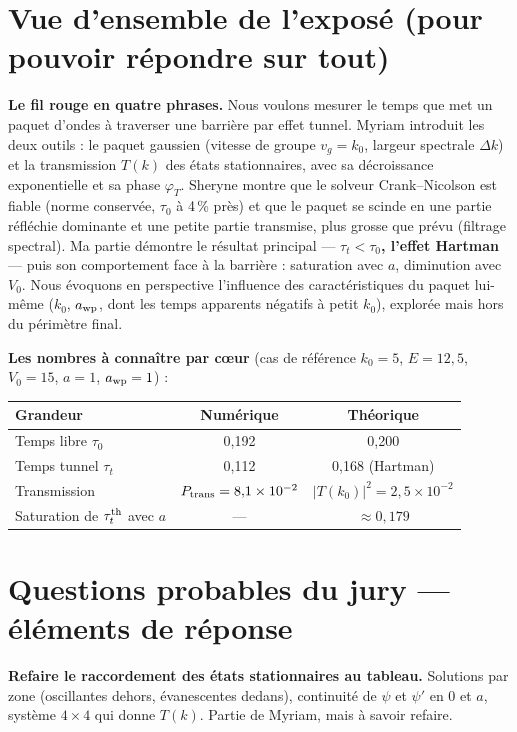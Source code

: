 \documentclass[11pt,a4paper]{article}
\begin{document}
\section*{Vue d'ensemble de l'exposé (pour pouvoir répondre sur tout)}

\textbf{Le fil rouge en quatre phrases.} Nous voulons mesurer le temps que met un
paquet d'ondes à traverser une barrière par effet tunnel. Myriam introduit les
deux outils : le paquet gaussien (vitesse de groupe $v_g = k_0$, largeur
spectrale $\Delta k$) et la transmission $T(k)$ des états stationnaires, avec sa
décroissance exponentielle et sa phase $\varphi_T$. Sheryne montre que le solveur
Crank--Nicolson est fiable (norme conservée, $\tau_0$ à 4\,\% près) et que le
paquet se scinde en une partie réfléchie dominante et une petite partie
transmise, plus grosse que prévu (filtrage spectral). Ma partie démontre le
résultat principal --- \textbf{$\tau_t < \tau_0$, l'effet Hartman} --- puis son
comportement face à la barrière : saturation avec $a$, diminution avec $V_0$.
Nous évoquons en perspective l'influence des caractéristiques du paquet
lui-même ($k_0$, $a_{\rm wp}$, dont les temps apparents négatifs à petit
$k_0$), explorée mais hors du périmètre final.

\textbf{Les nombres à connaître par c\oe ur} (cas de référence $k_0 = 5$,
$E = 12{,}5$, $V_0 = 15$, $a = 1$, $a_{\rm wp} = 1$) :

\begin{center}
\begin{tabular}{lcc}
\toprule
Grandeur & Numérique & Théorique \\
\midrule
Temps libre $\tau_0$ & 0{,}192 & 0{,}200 \\
Temps tunnel $\tau_t$ & 0{,}112 & 0{,}168 (Hartman) \\
Transmission & $P_{\rm trans} = 8{,}1\times10^{-2}$ & $|T(k_0)|^2 = 2{,}5\times10^{-2}$ \\
Saturation de $\tau_t^{\rm th}$ avec $a$ & --- & $\approx 0{,}179$ \\
\bottomrule
\end{tabular}
\end{center}

\section*{Questions probables du jury --- éléments de réponse}

\textbf{Refaire le raccordement des états stationnaires au tableau.}
Solutions par zone (oscillantes dehors, évanescentes dedans), continuité de
$\psi$ et $\psi'$ en $0$ et $a$, système $4\times4$ qui donne $T(k)$. Partie de
Myriam, mais à savoir refaire.
\end{document}
